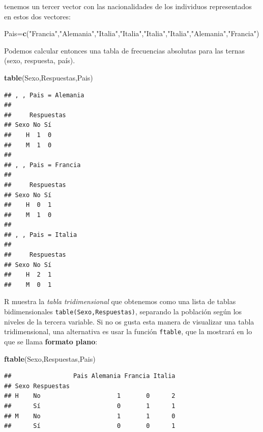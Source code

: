 \documentclass[]{book}
\newenvironment{Shaded}{\begin{snugshade}}{\end{snugshade}}
\newcommand{\KeywordTok}[1]{\textcolor[rgb]{0.13,0.29,0.53}{\textbf{#1}}}
\newcommand{\NormalTok}[1]{#1}
\newcommand{\StringTok}[1]{\textcolor[rgb]{0.31,0.60,0.02}{#1}}
\theoremstyle{definition}
\theoremstyle{definition}
\theoremstyle{definition}
\theoremstyle{remark}
\begin{document}
tenemos un tercer vector con las nacionalidades de los individuos representados en estos dos vectores:

\begin{Shaded}
\begin{Highlighting}[]
\NormalTok{Pais=}\KeywordTok{c}\NormalTok{(}\StringTok{"Francia"}\NormalTok{,}\StringTok{"Alemania"}\NormalTok{,}\StringTok{"Italia"}\NormalTok{,}\StringTok{"Italia"}\NormalTok{,}\StringTok{"Italia"}\NormalTok{,}\StringTok{"Italia"}\NormalTok{,}\StringTok{"Alemania"}\NormalTok{,}\StringTok{"Francia"}\NormalTok{)}
\end{Highlighting}
\end{Shaded}

Podemos calcular entonces una tabla de frecuencias absolutas para las ternas (sexo, respuesta, país).

\begin{Shaded}
\begin{Highlighting}[]
\KeywordTok{table}\NormalTok{(Sexo,Respuestas,Pais)}
\end{Highlighting}
\end{Shaded}

\begin{verbatim}
## , , Pais = Alemania
## 
##     Respuestas
## Sexo No Sí
##    H  1  0
##    M  1  0
## 
## , , Pais = Francia
## 
##     Respuestas
## Sexo No Sí
##    H  0  1
##    M  1  0
## 
## , , Pais = Italia
## 
##     Respuestas
## Sexo No Sí
##    H  2  1
##    M  0  1
\end{verbatim}

R muestra la \emph{tabla tridimensional} que obtenemos como una lista de tablas bidimensionales \texttt{table(Sexo,Respuestas)}, separando la población según los niveles de la tercera variable. Si no os gusta esta manera de visualizar una tabla tridimensional, una alternativa es usar la función \texttt{ftable}, que la mostrará en lo que se llama \textbf{formato plano}:

\begin{Shaded}
\begin{Highlighting}[]
\KeywordTok{ftable}\NormalTok{(Sexo,Respuestas,Pais)}
\end{Highlighting}
\end{Shaded}

\begin{verbatim}
##                 Pais Alemania Francia Italia
## Sexo Respuestas                             
## H    No                     1       0      2
##      Sí                     0       1      1
## M    No                     1       1      0
##      Sí                     0       0      1
\end{verbatim}
\end{document}
